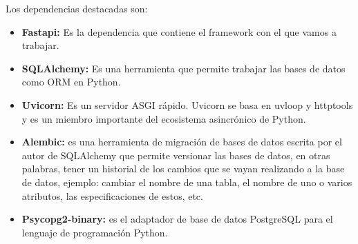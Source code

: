 Los dependencias destacadas son: 
\begin{itemize}
    \item \textbf{Fastapi: }Es la dependencia que contiene el framework con el que vamos a trabajar.
    \item \textbf{SQLAlchemy: }Es una herramienta que permite trabajar las bases de datos como \gls{ORM} en Python.
    \item \textbf{Uvicorn: }Es un servidor ASGI rápido. Uvicorn se basa en uvloop y httptools y es un miembro importante del ecosistema asincrónico de Python.
    \item \textbf{Alembic: }es una herramienta de migración de bases de datos escrita por el autor de SQLAlchemy que permite versionar las bases de datos, en otras palabras, tener un historial de los cambios que se vayan realizando a la base de datos, ejemplo: cambiar el nombre de una tabla, el nombre de uno o varios atributos, las especificaciones de estos, etc.
    \item \textbf{Psycopg2-binary: }es el adaptador de base de datos PostgreSQL para el lenguaje de programación Python.
\end{itemize}


